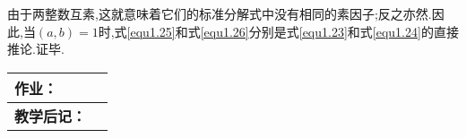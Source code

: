 由于两整数互素,这就意味着它们的标准分解式中没有相同的素因子;反之亦然.因此,当$(a, b)=1$时,式\eqref{equ1.25}和式\eqref{equ1.26}分别是式\eqref{equ1.23}和式\eqref{equ1.24}的直接推论.证毕.

\begin{table}[htb]
	\centering  
	\begin{tabular}{p{22mm}|p{105.6mm}}
		\hline 
		\textbf{作业：}      &   \\ \hline
		\textbf{教学后记：}  & \vspace{4ex} \\ \hline
	\end{tabular}
\end{table}



